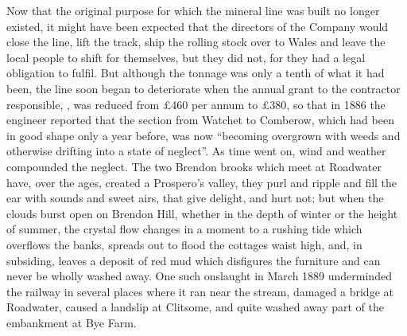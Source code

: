 \documentclass[10pt,a4paper]{article}
\begin{document}
   Now that the original purpose for which the mineral line was built no longer existed, it might have been expected that the directors of the Company would close the line, lift the track, ship the rolling stock over to Wales and leave the local people to shift for themselves, but they did not, for they had a legal obligation to fulfil.  But although the tonnage was only a tenth of what it had been, the line soon began to deteriorate when the annual grant to the contractor responsible,                      , was reduced from £460 per annum to £380, so that in 1886 the engineer reported that the section from Watchet to Comberow, which had been in good shape only a year before, was now “becoming overgrown with weeds and otherwise drifting into a state of neglect”. As time went on, wind and weather compounded the neglect. The two Brendon brooks which meet at Roadwater have, over the ages, created a Prospero’s valley, they purl and ripple and fill the ear with sounds and sweet airs, that give delight, and hurt not; but when the clouds burst open on Brendon Hill, whether in the depth of winter or the height of summer, the crystal flow changes in a moment to a rushing  tide which overflows the banks, spreads out  to flood the cottages waist high, and, in subsiding, leaves a deposit of red mud which disfigures the furniture and can never be wholly washed away. One such onslaught in March 1889 underminded the railway in several places where it ran near the stream, damaged a bridge at Roadwater, caused a landslip at Clitsome, and quite washed away part of the embankment at Bye Farm.                                                                                                                                                                                      
   
\end{document}
